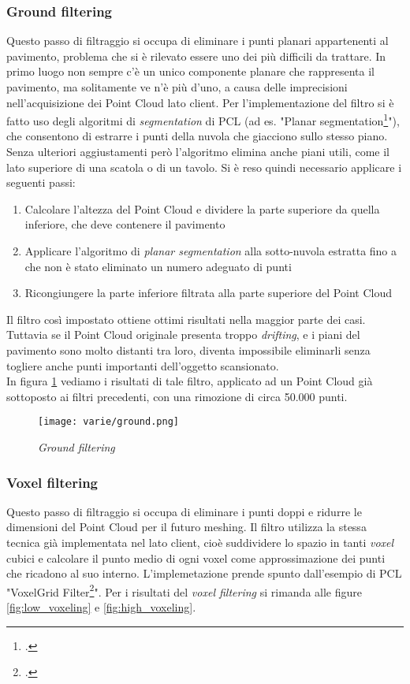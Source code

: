 \subsubsection{Ground filtering}
Questo passo di filtraggio si occupa di eliminare i punti planari appartenenti al pavimento, problema che si è rilevato essere uno dei più difficili da trattare. 
In primo luogo non sempre c'è un unico componente planare che rappresenta il pavimento, ma solitamente ve n'è più d'uno, a causa delle imprecisioni nell'acquisizione dei Point Cloud lato client. Per l'implementazione del filtro si è fatto uso degli algoritmi di \emph{segmentation} di PCL (ad es. "Planar segmentation\footcite{http://pointclouds.org/documentation/tutorials/planar_segmentation.php}"), che consentono di estrarre i punti della nuvola che giacciono sullo stesso piano. Senza ulteriori aggiustamenti però l'algoritmo elimina anche piani utili, come il lato superiore di una scatola o di un tavolo.
Si è reso quindi necessario applicare i seguenti passi:
\begin{enumerate}
\item Calcolare l'altezza del Point Cloud e dividere la parte superiore da quella inferiore, che deve contenere il pavimento
\item Applicare l'algoritmo di \emph{planar segmentation} alla sotto-nuvola estratta fino a che non è stato eliminato un numero adeguato di punti
\item Ricongiungere la parte inferiore filtrata alla parte superiore del Point Cloud
\end{enumerate}
Il filtro così impostato ottiene ottimi risultati nella maggior parte dei casi. Tuttavia se il Point Cloud originale presenta troppo  \emph{drifting}, e i piani del pavimento sono molto distanti tra loro, diventa impossibile eliminarli senza togliere anche punti importanti dell'oggetto scansionato.\\
In figura \ref{fig:ground} vediamo i risultati di tale filtro, applicato ad un Point Cloud già sottoposto ai filtri precedenti, con una rimozione di circa 50.000 punti.
\begin{figure}[!h] 
    \centering 
    \texttt{[image: varie/ground.png]} 
    \caption{\emph{Ground filtering}}
    \label{fig:ground}
\end{figure}

\subsubsection{Voxel filtering}
Questo passo di filtraggio si occupa di eliminare i punti doppi e ridurre le dimensioni del Point Cloud per il futuro meshing. Il filtro utilizza la stessa tecnica già implementata nel lato client, cioè suddividere lo spazio in tanti \emph{voxel} cubici e  calcolare il punto medio di ogni voxel come approssimazione dei punti che ricadono al suo interno. L'implemetazione prende spunto dall'esempio di PCL "VoxelGrid Filter\footcite{http://pointclouds.org/documentation/tutorials/voxel_grid.php}".
Per i risultati del \emph{voxel filtering} si rimanda alle figure \ref{fig:low_voxeling} e \ref{fig:high_voxeling}.
